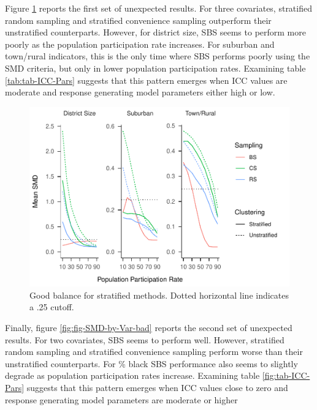 \documentclass[man,floatsintext]{apa6}
\begin{document}
Figure \ref{fig:fig-SMD-by-Var-good2} reports the first set of unexpected results. For three covariates, stratified random sampling and stratified convenience sampling outperform their unstratified counterparts. However, for district size, SBS seems to perform more poorly as the population participation rate increases. For suburban and town/rural indicators, this is the only time where SBS performs poorly using the SMD criteria, but only in lower population participation rates. Examining table \ref{tab:tab-ICC-Pars} suggests that this pattern emerges when ICC values are moderate and response generating model parameters either high or low.



\begin{figure}
\centering
\includegraphics{GenSamp_Paper_files/figure-latex/fig-SMD-by-Var-good2-1.pdf}
\caption{\label{fig:fig-SMD-by-Var-good2}Good balance for stratified methods. Dotted horizontal line indicates a .25 cutoff.}
\end{figure}

Finally, figure \ref{fig:fig-SMD-by-Var-bad} reports the second set of unexpected results. For two covariates, SBS seems to perform well. However, stratified random sampling and stratified convenience sampling perform worse than their unstratified counterparts. For \% black SBS performance also seems to slightly degrade as population participation rates increase. Examining table \ref{fig:tab-ICC-Pars} suggests that this pattern emerges when ICC values close to zero and response generating model parameters are moderate or higher
\end{document}
